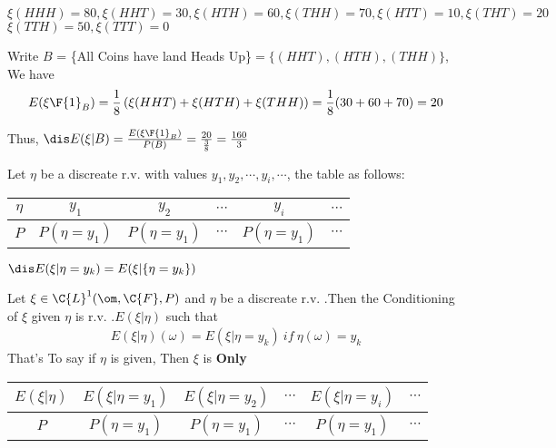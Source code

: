 \noindent$\xi(HHH) = 80, \xi(HHT) = 30, \xi(HTH) = 60, 
\xi(THH) = 70, \xi(HTT) = 10, \xi(THT) = 20$\\
$\xi(TTH) = 50, \xi(TTT) = 0$

Write $B$ = \{All Coins have land Heads Up\}$ = \{(HHT), (HTH), (THH)\}$, We have
\begin{align*}
    E(\xi\F{1}_B) = \frac18\left(\xi(HHT)+\xi(HTH)+\xi(THH)\right) = \frac18 (30+60+70) = 20
\end{align*}

Thus, $\dis E(\xi|B) = \frac{E(\xi\F{1}_B)}{P(B)} = \frac{20}{\frac38} = \frac{160}{3}$

\newpage


Let $\eta$ be a discreate r.v. with values $y_1, y_2, \cdots, y_i, \cdots$, the table as follows:

\begin{center}
    \begin{tabular}{c|ccccc}
        $\eta$ & $y_1$ & $y_2$ & $\cdots$ & $y_i$ & $\cdots$ \\
        \hline
        $P$ & $P(\eta = y_1)$ & $P(\eta = y_1)$ & $\cdots$ & $P(\eta = y_1)$ & $\cdots$ \\  
    \end{tabular}    
\end{center}


 $\dis E(\xi|\eta =y_k) = E(\xi |\{\eta=y_k\})$ 

\begin{definition}
    Let $\xi \in \C{L}^1(\om, \C{F}, P)$ and $\eta$ be a  discreate r.v. .Then
    the Conditioning of $\xi$ given $\eta$ is r.v. .$E(\xi|\eta)$  such that
    \begin{align}
        E(\xi|\eta)(\omega) = E(\xi|\eta=y_k)\ if\ \eta(\omega) = y_k
    \end{align}
    That's To say if $\eta$ is given, Then $\xi$ is \textbf{Only}
\end{definition}


\remark
\begin{center}
    \begin{tabular}{c|ccccc}
        $E(\xi|\eta)$ & $E(\xi|\eta=y_1)$ & $E(\xi|\eta=y_2)$ & $\cdots$ & $E(\xi|\eta=y_i)$ & $\cdots$ \\
        \hline
        $P$ & $P(\eta = y_1)$ & $P(\eta = y_1)$ & $\cdots$ & $P(\eta = y_1)$ & $\cdots$ \\  
    \end{tabular} 
\end{center}


